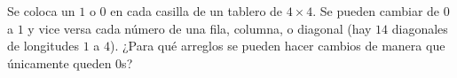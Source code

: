 Se coloca un $1$ o $0$ en cada casilla de un tablero de $4\times 4$. Se pueden cambiar de $0$ a $1$ y vice versa cada número de una fila, columna, o diagonal (hay $14$ diagonales de longitudes $1$ a $4$). ¿Para qué arreglos se pueden hacer cambios de manera que únicamente queden $0$s?
